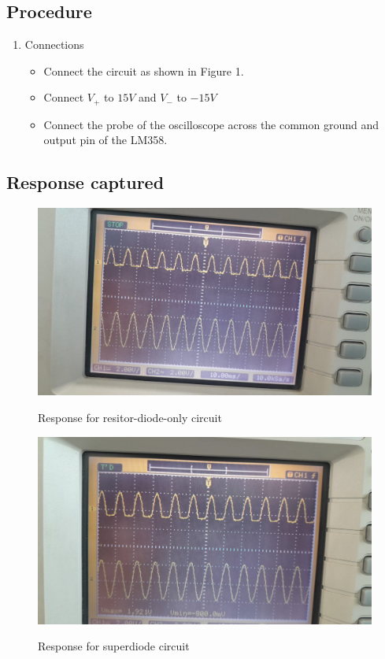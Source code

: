 \documentclass[a4paper,12pt]{article}
\begin{document}
\subsection{Procedure}
\begin{enumerate}
\item Connections
\begin{itemize}
\item Connect the circuit as shown in Figure 1.
\item Connect $V_+$ to $15 V$ and $V_-$ to $-15 V$ 
\item Connect the probe of the oscilloscope across the common ground and output pin of the LM358.
\end{itemize}
\end{enumerate}

\subsection{Response captured}
\begin{figure}[H]
  {\includegraphics[width=\columnwidth]{figs/opamprect.jpg}}
  \caption{Response for resitor-diode-only circuit}
\end{figure}
\begin{figure}[H]
  {\includegraphics[width=\columnwidth]{figs/simprect.jpg}}
  \caption{Response for superdiode circuit}
\end{figure}
\end{document}
